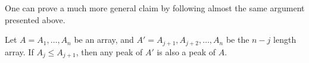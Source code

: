 One can prove a much more general claim by following almost the same argument presented above.

 \begin{claim} \label{claim:subarraymiddle} 
   Let $A = A_1, \dots, A_n$ be an array, and $A' = A_{j+1}, A_{j+2}, \dots, A_n$ be the $n-j$ length array. If $A_j \le A_{j+1}$, then any peak of $A'$ is also a peak of $A$.
\end{claim}
%
